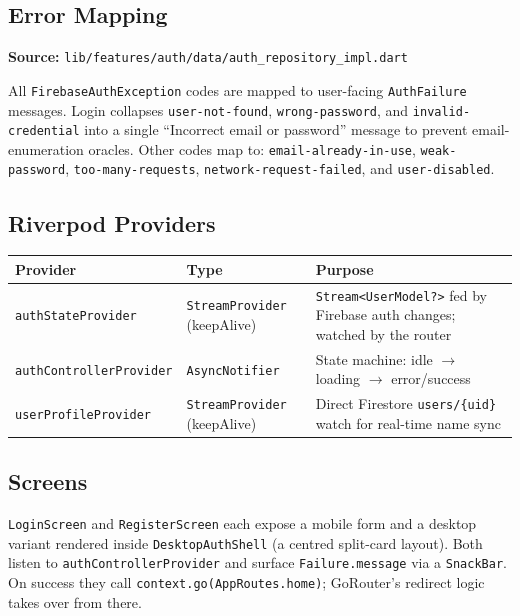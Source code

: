 \documentclass[11pt,a4paper]{article}
\begin{document}
\subsection{Error Mapping}

\textbf{Source:} \texttt{lib/features/auth/data/auth\_repository\_impl.dart}

All \texttt{FirebaseAuthException} codes are mapped to user-facing \texttt{AuthFailure}
messages. Login collapses \texttt{user-not-found}, \texttt{wrong-password}, and
\texttt{invalid-credential} into a single ``Incorrect email or password'' message to
prevent email-enumeration oracles. Other codes map to: \texttt{email-already-in-use},
\texttt{weak-password}, \texttt{too-many-requests}, \texttt{network-request-failed},
and \texttt{user-disabled}.

\subsection{Riverpod Providers}

\vspace{4pt}
\begin{tabularx}{\textwidth}{@{}L{4.8cm} L{2.8cm} L{6.0cm}@{}}
  \toprule
  \textbf{Provider} & \textbf{Type} & \textbf{Purpose} \\
  \midrule
  \texttt{authStateProvider} & \texttt{StreamProvider} (keepAlive) &
    \texttt{Stream<UserModel?>} fed by Firebase auth changes; watched by the router \\
  \texttt{authControllerProvider} & \texttt{AsyncNotifier} &
    State machine: idle $\to$ loading $\to$ error/success \\
  \texttt{userProfileProvider} & \texttt{StreamProvider} (keepAlive) &
    Direct Firestore \texttt{users/\{uid\}} watch for real-time name sync \\
  \bottomrule
\end{tabularx}

\subsection{Screens}

\texttt{LoginScreen} and \texttt{RegisterScreen} each expose a mobile form and a
desktop variant rendered inside \texttt{DesktopAuthShell} (a centred split-card layout).
Both listen to \texttt{authControllerProvider} and surface \texttt{Failure.message}
via a \texttt{SnackBar}. On success they call \texttt{context.go(AppRoutes.home)};
GoRouter's redirect logic takes over from there.
\end{document}
